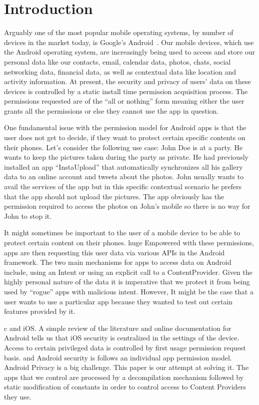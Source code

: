 \section{Introduction}

Arguably one of the most popular mobile operating systems, by number of devices in the market today, is Google's Android~\cite{winningHarry2013}. Our mobile devices, which use the Android operating system, are increasingly being used to access and store our personal data like our contacts, email, calendar data, photos, chats, social networking data, financial data, as well as contextual data like location and activity information. At present, the security and privacy of users' data on these devices is controlled by a static install time permission acquisition process. The permissions requested are of the ``all or nothing'' form meaning either the user grants all the permissions or else they cannot use the app in question. 

One fundamental issue with the permission model for Android apps is that the user does not get to decide, if they want to protect certain specific contents on their phones. Let's consider the following use case:
John Doe is at a party. He wants to keep the pictures taken during the party as private. He had previously installed an app ``InstaUpload'' that automatically synchronizes all his gallery data to an online account and tweets about the photos. John usually wants to avail the services of the app but in this specific contextual scenario he prefers that the app should not upload the pictures. The app obviously has the permission required to access the photos on John's mobile so there is no way for John to stop it.


It might sometimes be important to the user of a mobile device to be able to protect certain content on their phones. huge Empowered with these permissions, apps are then requesting this user data via various APIs in the Android framework. The two main mechanisms for apps to access data on Android include, using an Intent or using an explicit call to a ContentProvider. Given the highly personal nature of the data it is imperative that we protect it from being used by ``rogue'' apps with malicious intent. However, It might be the case that a user wants to use a particular app because they wanted to test out certain features provided by it. 

c and iOS. A simple review of the literature and online documentation for Android tells us that iOS security is centralized in the settings of the device. Access to certain privileged data is controlled by first usage permission request basis. and Android security is follows an individual app permission model. Android Privacy is a big challenge. This paper is our attempt at solving it.
The apps that we control are processed by a decompilation mechanism followed by static modification of constants in order to control access to Content Providers they use.

